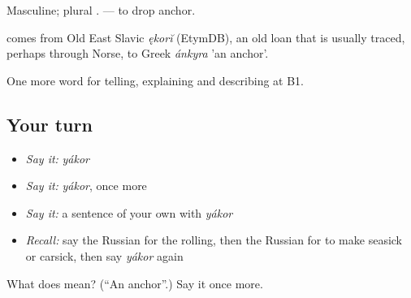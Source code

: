 Masculine; plural \emph{}. \emph{ } — to drop anchor.

\begin{cousinweb}
\emph{} comes from Old East Slavic \emph{ękorĭ} (EtymDB), an old loan that is usually traced, perhaps through Norse, to Greek \emph{ánkyra} 'an anchor'.
\end{cousinweb}

\begin{grammarlens}[title={What you've built}]
One more word for telling, explaining and describing at B1.
\end{grammarlens}

\subsection*{Your turn}
\begin{itemize}
\raggedright
  \item \emph{Say it:} \emph{yákor}
  \item \emph{Say it:} \emph{yákor}, once more
  \item \emph{Say it:} a sentence of your own with \emph{yákor}
  \item \emph{Recall:} say the Russian for the rolling, then the Russian for to make seasick or carsick, then say \emph{yákor} again
\end{itemize}

\begin{tcolorbox}[breakable,colback=teal!4,colframe=teal!35!black,title={Before you move on}]
What does  mean? (\textquotedblleft{}An anchor\textquotedblright{}.) Say it once more.
\end{tcolorbox}
